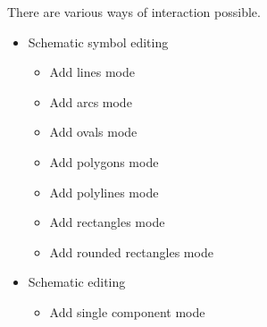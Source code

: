 \documentclass[letterpaper,12pt,twoside]{book}
\begin{document}
There are various ways of interaction possible.
\begin {itemize}
\item Schematic symbol editing
\begin {itemize}
\item Add lines mode
\item Add arcs mode
\item Add ovals mode
\item Add polygons mode
\item Add polylines mode
\item Add rectangles mode
\item Add rounded rectangles mode
\end {itemize}
\item Schematic editing
\begin{itemize}
\item Add single component mode
\end{itemize}
\end {itemize}
\end{document}
